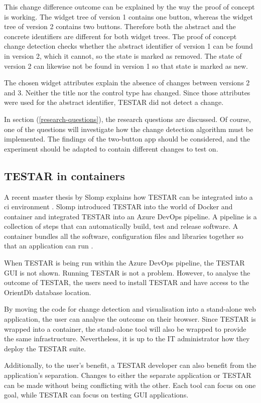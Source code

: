 This change difference outcome can be explained by the way the proof of concept is working. The widget tree of version 1 contains one button, whereas the widget tree of version 2 contains two buttons. Therefore both the abstract and the concrete identifiers are different for both widget trees. The proof of concept change detection checks whether the abstract identifier of version 1 can be found in version 2, which it cannot, so the state is marked as removed. The state of version 2 can likewise not be found in version 1 so that state is marked as new.

The chosen widget attributes explain the absence of changes between versions 2 and 3. Neither the title nor the control type has changed. Since those attributes were used for the abstract identifier, TESTAR did not detect a change. 

In section (\ref{research-questions}), the research questions are discussed. Of course, one of the questions will investigate how the change detection algorithm must be implemented. The findings of the two-button app should be considered, and the experiment should be adapted to contain different changes to test on. 

\subsection{TESTAR in containers}
A recent master thesis by Slomp explains how TESTAR can be integrated into a \acrfull{ci} environment \cite{thesisSlomp}. Slomp introduced TESTAR into the world of Docker and container and integrated TESTAR into an Azure DevOps pipeline. A pipeline is a collection of steps that can automatically build, test and release software. A container bundles all the software, configuration files and libraries together so that an application can run \cite{ms-container}. 

When TESTAR is being run within the Azure DevOps pipeline, the TESTAR GUI is not shown. Running TESTAR is not a problem. However, to analyse the outcome of TESTAR, the users need to install TESTAR and have access to the OrientDb database location. 

By moving the code for change detection and visualisation into a stand-alone web application, the user can analyse the outcome on their browser. Since TESTAR is wrapped into a container, the stand-alone tool will also be wrapped to provide the same infrastructure. Nevertheless, it is up to the IT administrator how they deploy the TESTAR suite. 

Additionally, to the user's benefit, a TESTAR developer can also benefit from the application's separation. Changes to either the separate application or TESTAR can be made without being conflicting with the other. Each tool can focus on one goal, while TESTAR can focus on testing GUI applications. 